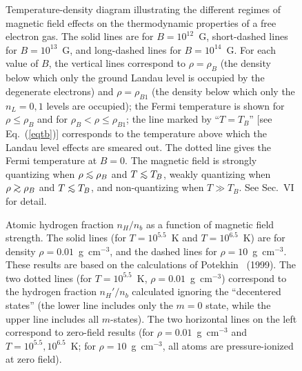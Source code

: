 \begin{figure}[t]
\vspace*{60mm}
\caption{Temperature-density diagram illustrating the different regimes 
of magnetic field effects on the thermodynamic properties of 
a free electron gas. The solid lines are for $B=10^{12}$~G,
short-dashed lines for $B=10^{13}$~G, and long-dashed lines for 
$B=10^{14}$~G. For each value of $B$, the vertical lines
correspond to $\rho=\rho_B$ (the density below which only the ground Landau
level is occupied by the degenerate electrons) and $\rho=\rho_{B1}$ (the
density below which only the $n_L=0,1$ levels are occupied); the Fermi
temperature is shown for $\rho\le\rho_B$ and for $\rho_B<\rho\le\rho_{B1}$;
the line marked by ``$T=T_B$'' [see Eq.~(\ref{eqtb})] corresponds to
the temperature above which the Landau level effects are smeared out.
The dotted line gives the Fermi
temperature at $B=0$. The magnetic field is strongly quantizing when
$\rho\lo \rho_B$ and $T\lo T_B$, weakly quantizing when $\rho\go \rho_B$ and
$T\lo T_B$, and non-quantizing when $T\gg T_B$. See Sec.~VI for detail.   
}
\end{figure}


\clearpage

\begin{figure}[t]
\vspace*{60mm}
\caption{Atomic hydrogen fraction $n_H/n_b$ as a function of 
magnetic field strength. The solid lines (for $T=10^{5.5}$~K 
and $T=10^{6.5}$~K) are for density $\rho=0.01$~g~cm$^{-3}$, and the dashed
lines for $\rho=10$~g~cm$^{-3}$. These results are based on the calculations
of Potekhin \etal~(1999). The two dotted lines (for $T=10^{5.5}$~K,
$\rho=0.01$~g~cm$^{-3}$) correspond to the hydrogen fraction $n_H'/n_b$
calculated ignoring the ``decentered states'' (the lower line includes 
only the $m=0$ state, while the upper line includes all $m$-states). 
The two horizontal lines on the left correspond to zero-field results
(for $\rho=0.01$~g~cm$^{-3}$ and $T=10^{5.5},10^{6.5}$~K;
for $\rho=10$~g~cm$^{-3}$, all atoms are pressure-ionized at zero field).
}
\end{figure}

